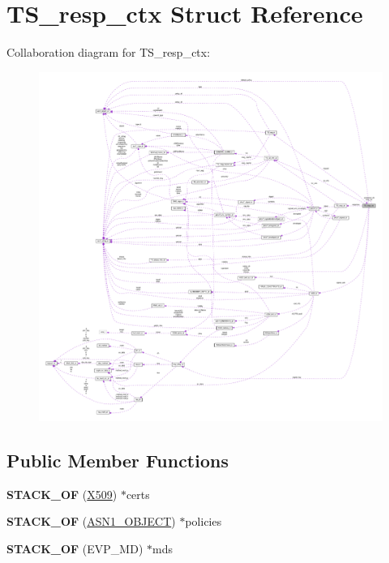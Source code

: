 \hypertarget{structTS__resp__ctx}{}\section{T\+S\+\_\+resp\+\_\+ctx Struct Reference}
\label{structTS__resp__ctx}


Collaboration diagram for T\+S\+\_\+resp\+\_\+ctx\+:
\nopagebreak
\begin{figure}[H]
\begin{center}
\leavevmode
\includegraphics[width=350pt]{structTS__resp__ctx__coll__graph}
\end{center}
\end{figure}
\subsection*{Public Member Functions}
\begin{DoxyCompactItemize}
\item 
\mbox{\label{structTS__resp__ctx_acca3532e1fe120037b15c9069787ebb5}} 
{\bfseries S\+T\+A\+C\+K\+\_\+\+OF} (\hyperlink{structx509__st}{X509}) $\ast$certs
\item 
\mbox{\label{structTS__resp__ctx_a042ada8c5f09433ffef7a94fd1143ccf}} 
{\bfseries S\+T\+A\+C\+K\+\_\+\+OF} (\hyperlink{structasn1__object__st}{A\+S\+N1\+\_\+\+O\+B\+J\+E\+CT}) $\ast$policies
\item 
\mbox{\label{structTS__resp__ctx_a753cb9f6a9ec57b7fb95dbb24774c058}} 
{\bfseries S\+T\+A\+C\+K\+\_\+\+OF} (E\+V\+P\+\_\+\+MD) $\ast$mds
\end{DoxyCompactItemize}
